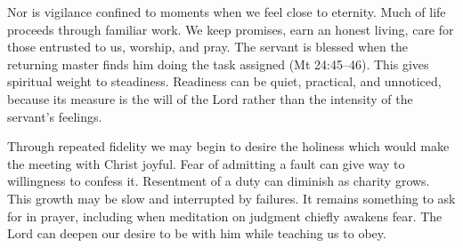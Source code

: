 Nor is vigilance confined to moments when we feel close to eternity. Much of life proceeds through familiar work. We keep promises, earn an honest living, care for those entrusted to us, worship, and pray. The servant is blessed when the returning master finds him doing the task assigned (Mt 24:45--46). This gives spiritual weight to steadiness. Readiness can be quiet, practical, and unnoticed, because its measure is the will of the Lord rather than the intensity of the servant's feelings.

Through repeated fidelity we may begin to desire the holiness which would make the meeting with Christ joyful. Fear of admitting a fault can give way to willingness to confess it. Resentment of a duty can diminish as charity grows. This growth may be slow and interrupted by failures. It remains something to ask for in prayer, including when meditation on judgment chiefly awakens fear. The Lord can deepen our desire to be with him while teaching us to obey.

